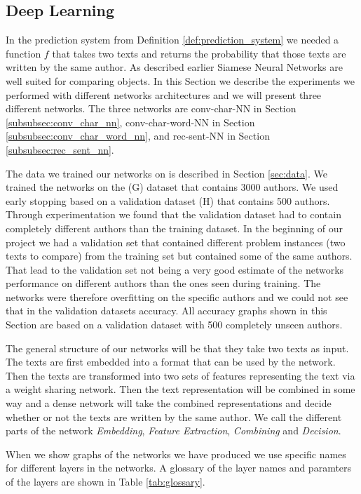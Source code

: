 \subsection{Deep Learning}

In the prediction system from Definition \ref{def:prediction_system} we needed
a function $f$ that takes two texts and returns the probability that those
texts are written by the same author. As described earlier Siamese Neural
Networks are well suited for comparing objects. In this Section we describe
the experiments we performed with different networks architectures and we
will present three different networks. The three networks are \gls{conv-char-NN}
in Section \ref{subsubsec:conv_char_nn}, \gls{conv-char-word-NN} in Section
\ref{subsubsec:conv_char_word_nn}, and \gls{rec-sent-NN} in Section
\ref{subsubsec:rec_sent_nn}.

The data we trained our networks on is described in Section \ref{sec:data}. We
trained the networks on the (G) dataset that contains 3000 authors. We used
early stopping based on a validation dataset (H) that contains 500 authors.
Through experimentation we found that the validation dataset had to contain
completely different authors than the training dataset. In the beginning of
our project we had a validation set that contained different problem instances
(two texts to compare) from the training set but contained some of the same
authors. That lead to the validation set not being a very good estimate of the
networks performance on different authors than the ones seen during training.
The networks were therefore overfitting on the specific authors and we could not
see that in the validation datasets accuracy. All accuracy graphs shown in this
Section are based on a validation dataset with 500 completely unseen authors.

The general structure of our networks will be that they take two texts as input.
The texts are first embedded into a format that can be used by the network.
Then the texts are transformed into two sets of features representing the text
via a weight sharing network. Then the text representation will be combined
in some way and a dense network will take the combined representations and
decide whether or not the texts are written by the same author. We call the
different parts of the network \textit{Embedding}, \textit{Feature Extraction},
\textit{Combining} and \textit{Decision}.

When we show graphs of the networks we have produced we use specific names for
different layers in the networks. A glossary of the layer names and paramters of
the layers are shown in Table \ref{tab:glossary}.

